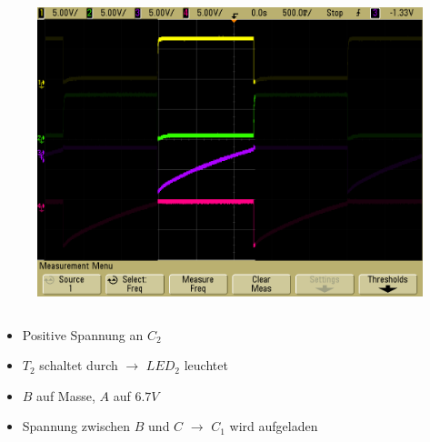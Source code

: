 \begin{frame}
\begin{columns}[c]
\begin{figure}[H]
\begin{center}
            \includegraphics[scale=0.12]{./img/oszi/blink_shade_2.png}
    \end{center}
    \end{figure}
    \end{columns}
    \begin{block}{}
         \begin{itemize}
            \item Positive Spannung an $C_2$
            \item $T_2$ schaltet durch $\rightarrow$ $LED_2$ leuchtet
            \item $B$ auf Masse, $A$ auf $6.7V$
            \item Spannung zwischen $B$ und $C$ $\rightarrow$ $C_1$ wird
            aufgeladen
         \end{itemize}
    \end{block}
\end{frame}
